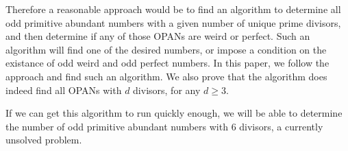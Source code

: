 \documentclass[../paper.tex]{article}
\begin{document}
Therefore a reasonable approach would be to find an algorithm to
determine all odd primitive abundant numbers with a given number 
of unique prime divisors, and then determine if any of those OPANs
are weird or perfect. Such an algorithm will find one of the
desired numbers, or impose a condition on the existance of odd
weird and odd perfect numbers. In this paper, we follow the
approach and find such an algorithm. We also prove that the
algorithm does indeed find all OPANs with $d$ divisors, for any $d
\geq 3$.

If we can get this algorithm to run quickly enough, we will be
able to determine the number of odd primitive abundant numbers
with $6$ divisors, a currently unsolved problem\cite{amato}.
\end{document}
